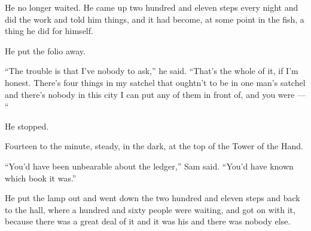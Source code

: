 He no longer waited. He came up two hundred and eleven steps every night and did the work and told him things, and it had become, at some point in the fish, a thing he did for himself.

He put the folio away.

“The trouble is that I’ve nobody to ask,” he said. “That’s the whole of it, if I’m honest. There’s four things in my satchel that oughtn’t to be in one man’s satchel and there’s nobody in this city I can put any of them in front of, and you were — “

He stopped.

Fourteen to the minute, steady, in the dark, at the top of the Tower of the Hand.

“You’d have been unbearable about the ledger,” Sam said. “You’d have known which book it was.”

He put the lamp out and went down the two hundred and eleven steps and back to the hall, where a hundred and sixty people were waiting, and got on with it, because there was a great deal of it and it was his and there was nobody else.